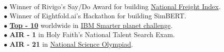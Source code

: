 \documentclass[margin,line]{resume}
\begin{document}
\begin{resume}
            \\$\bullet$ Winner of Rivigo's Say/Do Award for building \href{https://nationalfreightindex.co.in/}{National Freight Index}.
     \\$\bullet$ Winner of Eightfold.ai's Hackathon for building SimBERT.
    \\$\bullet$ \href{https://timesofindia.indiatimes.com/city/mangaluru/Mangalore-students-take-eco-literacy-online/articleshow/24455031.cms}{\bfseries{Top - 10}} worldwide in \href{http://www.ibm.com/ibm/history/ibm100/us/en/icons/smarterplanet/}{IBM Smarter planet challenge}.
\\$\bullet$ {\bfseries AIR - 1} in Holy Faith's National Talent Search Exam.
    \\$\bullet$ {\bfseries AIR - 21} in \href{http://www.sofworld.org/nso}{National Science Olympiad}.

         

\end{resume}
\end{document}
